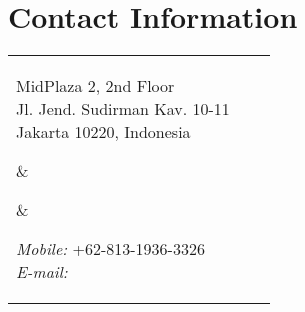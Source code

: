 
\section{Contact Information}

%
%
\newlength{\rcollength}\setlength{\rcollength}{2in}%
\newlength{\spacewidth}\setlength{\spacewidth}{20pt}
%
\begin{tabular}[t]{@{}p{\textwidth-\rcollength-\spacewidth}@{}p{\spacewidth}@{}p{\rcollength}}%

\parbox{\textwidth-\rcollength-\spacewidth}{%
MidPlaza 2, 2nd Floor\\
Jl. Jend. Sudirman Kav. 10-11\\
Jakarta 10220, Indonesia}

&
\parbox[m][5\baselineskip]{\spacewidth}{} &

\parbox{\rcollength}{%
\textit{Mobile:} +62-813-1936-3326 \\
\textit{E-mail:} \\
}

\end{tabular}
